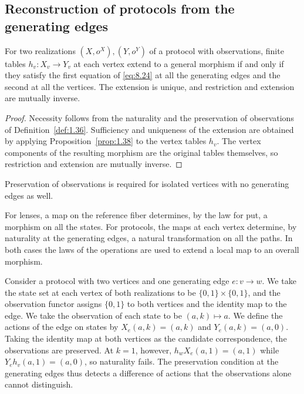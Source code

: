 \subsection*{Reconstruction of protocols from the generating edges}

\begin{proposition}\label{prop:8.28}

For two realizations $(X,o^X),(Y,o^Y)$ of a protocol with observations, finite tables
$h_v:X_v\to Y_v$ at each vertex extend to a general morphism if and only if they satisfy the
first equation of \eqref{eq:8.24} at all the generating edges and the second at all the
vertices.
The extension is unique, and restriction and extension are mutually inverse.

\end{proposition}

\begin{proof}

Necessity follows from the naturality and the preservation of observations of
Definition~\ref{def:1.36}.
Sufficiency and uniqueness of the extension are obtained by applying
Proposition~\ref{prop:1.38} to the vertex tables $h_v$.
The vertex components of the resulting morphism are the original tables themselves, so
restriction and extension are mutually inverse.

\end{proof}

Preservation of observations is required for isolated vertices with no generating edges as
well.

For lenses, a map on the reference fiber determines, by the law for put, a morphism on all the
states.
For protocols, the maps at each vertex determine, by naturality at the generating edges, a
natural transformation on all the paths.
In both cases the laws of the operations are used to extend a local map to an overall
morphism.

\begin{example}\label{ex:8.29}

Consider a protocol with two vertices and one generating edge $e:v\to w$.
We take the state set at each vertex of both realizations to be $\{0,1\}\times\{0,1\}$, and
the observation functor assigns $\{0,1\}$ to both vertices and the identity map to the edge.
We take the observation of each state to be $(a,k)\mapsto a$.
We define the actions of the edge on states by $X_e(a,k)=(a,k)$ and $Y_e(a,k)=(a,0)$.
Taking the identity map at both vertices as the candidate correspondence, the observations are
preserved.
At $k=1$, however, $h_wX_e(a,1)=(a,1)$ while $Y_eh_v(a,1)=(a,0)$, so naturality fails.
The preservation condition at the generating edges thus detects a difference of actions that
the observations alone cannot distinguish.

\end{example}

